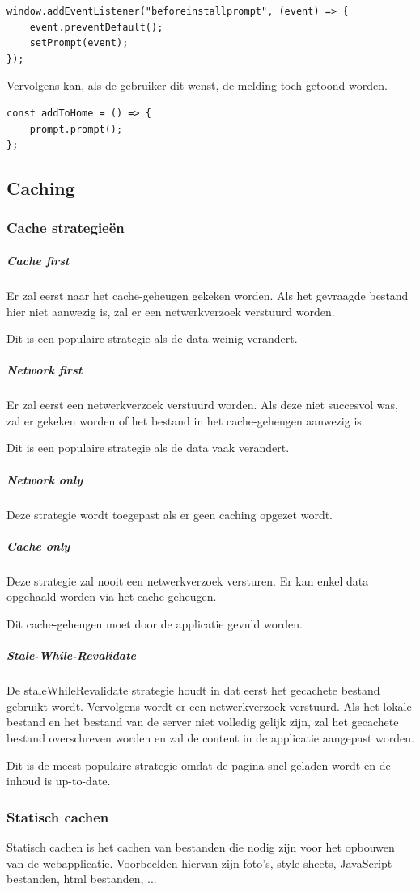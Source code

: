 \begin{lstlisting}
window.addEventListener("beforeinstallprompt", (event) => {
	event.preventDefault();
	setPrompt(event);
}); 
\end{lstlisting}

		Vervolgens kan, als de gebruiker dit wenst, de melding toch getoond worden.
		
\begin{lstlisting}
const addToHome = () => {
	prompt.prompt();
};
\end{lstlisting}
	\subsection{Caching}
	
		\subsubsection{Cache strategieën}
		
			\subparagraph{Cache first}
				Er zal eerst naar het cache-geheugen gekeken worden. Als het gevraagde bestand hier niet aanwezig is, zal er een netwerkverzoek verstuurd worden.
				
				Dit is een populaire strategie als de data weinig verandert. 
			\subparagraph{Network first}
				Er zal eerst een netwerkverzoek verstuurd worden. Als deze niet succesvol was, zal er gekeken worden of het bestand in het cache-geheugen aanwezig is. 
				
				Dit is een populaire strategie als de data vaak verandert.
			\subparagraph{Network only}
				Deze strategie wordt toegepast als er geen caching opgezet wordt. 
			\subparagraph{Cache only}
				Deze strategie zal nooit een netwerkverzoek versturen. Er kan enkel data opgehaald worden via het cache-geheugen.
				
				Dit cache-geheugen moet door de applicatie gevuld worden.
			\subparagraph{Stale-While-Revalidate}
				De staleWhileRevalidate strategie houdt in dat eerst het gecachete bestand gebruikt wordt. Vervolgens wordt er een netwerkverzoek verstuurd. Als het lokale bestand en het bestand van de server niet volledig gelijk zijn, zal het gecachete bestand overschreven worden en zal de content  in de applicatie aangepast worden.
				
				Dit is de meest populaire strategie omdat de pagina snel geladen wordt en de inhoud is up-to-date.

		\subsubsection{Statisch cachen}
			Statisch cachen is het cachen van bestanden die nodig zijn voor het opbouwen van de webapplicatie. Voorbeelden hiervan zijn foto's, style sheets, JavaScript bestanden, html bestanden, ...
			
